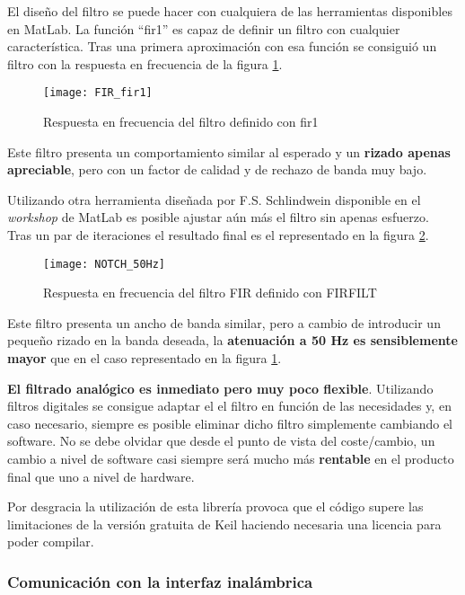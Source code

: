 El diseño del filtro se puede hacer con cualquiera de las herramientas disponibles en MatLab. La función ``fir1'' es capaz de definir un filtro con cualquier característica. Tras una primera aproximación con esa función se consiguió un filtro con la respuesta en frecuencia de la figura \ref{fig:FIR_fir1}.
\begin{figure} [H]
    \centering
    \texttt{[image: FIR\_fir1]}
    \caption{Respuesta en frecuencia del filtro definido con fir1}
    \label{fig:FIR_fir1}
\end{figure}

Este filtro presenta un comportamiento similar al esperado y un \textbf{rizado apenas apreciable}, pero con un factor de calidad y de rechazo de banda muy bajo. 

Utilizando otra herramienta diseñada por F.S. Schlindwein disponible en el \textit{workshop} de MatLab es posible ajustar aún más el filtro sin apenas esfuerzo. \\
Tras un par de iteraciones el resultado final es el representado en la figura \ref{fig:NOTCH_50Hz}.

\begin{figure} [H]
    \centering
    \texttt{[image: NOTCH\_50Hz]}
    \caption{Respuesta en frecuencia del filtro FIR definido con FIRFILT \cite{FIRFILT}}
    \label{fig:NOTCH_50Hz}
\end{figure}

Este filtro presenta un ancho de banda similar, pero a cambio de introducir un pequeño rizado en la banda deseada, la \textbf{atenuación a 50 Hz es sensiblemente mayor} que en el caso representado en la figura \ref{fig:FIR_fir1}.

\textbf{El filtrado analógico es inmediato pero muy poco flexible}. Utilizando filtros digitales se consigue adaptar el el filtro en función de las necesidades y, en caso necesario, siempre es posible eliminar dicho filtro simplemente cambiando el software. No se debe olvidar que desde el punto de vista del coste/cambio, un cambio a nivel de software casi siempre será mucho más \textbf{rentable} en el producto final que uno a nivel de hardware.

Por desgracia la utilización de esta librería provoca que el código supere las limitaciones de la versión gratuita de Keil haciendo necesaria una licencia para poder compilar.

\clearpage

\subsubsection{Comunicación con la interfaz inalámbrica\label{sec:Software_micro_ESP}}

